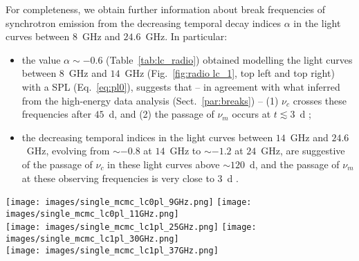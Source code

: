 \documentclass{aa}
\begin{document}
For completeness, we obtain further information about break frequencies of synchrotron emission from the decreasing temporal decay indices $\alpha$ in the light curves between $8$~GHz and $24.6$~GHz.
In particular:
\begin{itemize}
    \item the value $\alpha \sim -0.6$ (Table~\ref{tab:lc_radio}) obtained modelling the light curves between $8$~GHz and $14$~GHz (Fig.~\ref{fig:radio lc_1}, top left and top right) with a SPL (Eq.~\ref{eq:pl0}), suggests that -- in agreement with what inferred from the high-energy data analysis (Sect.~\ref{par:breaks}) -- (1) $\nu_c$ crosses these frequencies after $45$~d, and (2) the passage of $\nu_m$ occurs at $t \lesssim 3$~d \citep{Sari98};
    \item the decreasing temporal indices in the light curves between $14$~GHz and $24.6$~GHz, evolving from $\sim -0.8$ at $14$~GHz to $\sim -1.2$ at $24$~GHz, are suggestive of the passage of $\nu_c$ in these light curves above $\sim 120$~d, and the passage of $\nu_m$ at these observing frequencies is very close to $3$~d \citep{Sari98}.
\end{itemize}
%
\begin{figure*} %
\centering
{\texttt{[image: images/single\_mcmc\_lc0pl\_9GHz.png]}} \quad
{\texttt{[image: images/single\_mcmc\_lc0pl\_11GHz.png]}} \\
{\texttt{[image: images/single\_mcmc\_lc1pl\_25GHz.png]}} \quad
{\texttt{[image: images/single\_mcmc\_lc1pl\_30GHz.png]}} \\
{\texttt{[image: images/single\_mcmc\_lc1pl\_37GHz.png]}} \quad
\caption{Radio light curves of GRB\,160131A in the range $9-37$~GHz.
$8.93$~GHz (top left) and $11.4$~GHz (top right) fitted with a SPL (Eq.~\ref{eq:pl0}); the other light curves ($24.6$~GHz, middle left; $30.4$~GHz, middle right; $37.1$~GHz, bottom) are fitted with a BPL (Eq.~\ref{eq:pl1}).
Blue filled circles indicate detections, and upside down triangles indicate $3\sigma$ upper limits; red circles indicate the ignored points corresponding to the peaks observed in radio SEDs (Fig.~\ref{fig:radio sed_1}), and green lines show the resulting model.
}
\label{fig:radio lc_1}
\end{figure*}
%
\end{document}
